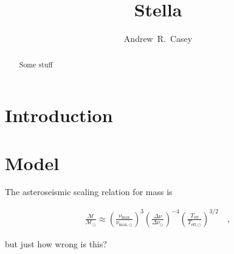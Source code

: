 \documentclass[preprint]{aastex}
\newcommand{\teff}{T_{\mathrm{eff}}}
\newcommand{\teffSolar}{T_{\mathrm{eff},\odot}}
\newcommand{\mass}{\mathcal{M}}
\newcommand{\massSolar}{\mass_\odot}
\newcommand{\numax}{\nu_\mathrm{max}}
\newcommand{\numaxSolar}{\nu_{\mathrm{max},\odot}}
\newcommand{\deltanu}{\Delta\nu}
\newcommand{\deltanuSolar}{\deltanu_\odot}
\begin{document}
\title{Stella}

\author{
  Andrew~R.~Casey
}


\begin{abstract}
  Some stuff
\end{abstract}




\section{Introduction} 
\label{sec:introduction}



\section{Model}
\label{sec:model}

The asteroseismic scaling relation for mass is

\begin{eqnarray}\label{eq:mass-scaling-relation}
    \frac{\mass}{\massSolar} \approx \left(\frac{\numax}{\numaxSolar}\right)^{3}\left(\frac{\deltanu}{\deltanuSolar}\right)^{-4}\left(\frac{\teff}{\teffSolar}\right)^{3/2}  \quad ,
\end{eqnarray}

\noindent{}but just how wrong is this?
\end{document}
